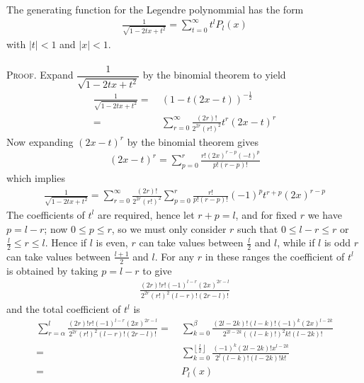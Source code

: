 \documentclass[a4paper]{article}
\numberwithin{equation}{section}
\begin{document}
The generating function for the Legendre polynommial has the form
\begin{align}
\frac{1}{{\sqrt {1 - 2tx + {t^2}} }} = \sum\limits_{t = 0}^\infty  {{t^l}{P_l}\left( x \right)} 
\end{align}
with $\left| t \right| < 1$ and $\left| x \right| < 1$.\\
\\
\textsc{Proof.} Expand $\dfrac{1}{{\sqrt {1 - 2tx + {t^2}} }}$ by the binomial theorem to yield
\begin{align}
\frac{1}{{\sqrt {1 - 2tx + {t^2}} }} =&\ {\left( {1 - t\left( {2x - t} \right)} \right)^{ - \frac{1}{2}}}\\
=&\ \sum\limits_{r = 0}^\infty  {\frac{{\left( {2r} \right)!}}{{{2^{2r}}{{\left( {r!} \right)}^2}}}{t^r}{{\left( {2x - t} \right)}^r}} 
\end{align}
Now expanding $\left( {2x - t} \right)^r$ by the binomial theorem gives
\begin{align}
{\left( {2x - t} \right)^r} = \sum\limits_{p = 0}^r {\frac{{r!{{\left( {2x} \right)}^{r - p}}{{\left( { - t} \right)}^p}}}{{p!\left( {r - p} \right)!}}} 
\end{align}
which implies
\begin{align}
\frac{1}{{\sqrt {1 - 2tx + {t^2}} }} = \sum\limits_{r = 0}^\infty  {\frac{{\left( {2r} \right)!}}{{{2^{2r}}{{\left( {r!} \right)}^2}}}\sum\limits_{p = 0}^r {\frac{{r!}}{{p!\left( {r - p} \right)!}}{{\left( { - 1} \right)}^p}{t^{r + p}}{{\left( {2x} \right)}^{r - p}}} } 
\end{align}
The coefficients of $t^l$ are required, hence let $r+p=l$, and for fixed $r$ we have $p=l-r$; now $0\le p\le r$, so we must only consider $r$ such that $0\le l-r\le r$ or $\frac{l}{2}\le r\le l$. Hence if $l$ is even, $r$ can take values between $\frac{l}{2}$ and $l$, while if $l$ is odd $r$ can take values between $\frac{l+1}{2}$ and $l$. For any $r$ in these ranges the coefficient of $t^l$ is obtained by taking $p=l-r$ to give
\begin{align}
\frac{{\left( {2r} \right)!r!{{\left( { - 1} \right)}^{l - r}}{{\left( {2x} \right)}^{2r - l}}}}{{{2^{2r}}{{\left( {r!} \right)}^2}\left( {l - r} \right)!\left( {2r - l} \right)!}}
\end{align}
and the total coefficient of $t^l$ is
\begin{align}
\sum\limits_{r = \alpha }^l {\frac{{\left( {2r} \right)!r!{{\left( { - 1} \right)}^{l - r}}{{\left( {2x} \right)}^{2r - l}}}}{{{2^{2r}}{{\left( {r!} \right)}^2}\left( {l - r} \right)!\left( {2r - l} \right)!}}} =&\ \sum\limits_{k = 0}^\beta  {\frac{{\left( {2l - 2k} \right)!\left( {l - k} \right)!{{\left( { - 1} \right)}^k}{{\left( {2x} \right)}^{l - 2k}}}}{{{2^{2l - 2k}}{{\left( {\left( {l - k} \right)!} \right)}^2}k!\left( {l - 2k} \right)!}}} \\
=&\ \sum\limits_{k = 0}^{\left\lfloor {\frac{l}{2}} \right\rfloor } {\frac{{{{\left( { - 1} \right)}^k}\left( {2l - 2k} \right)!{x^{l - 2k}}}}{{{2^l}\left( {l - k} \right)!\left( {l - 2k} \right)!k!}}} \\
=&\ {P_l}\left( x \right)
\end{align}
\end{document}
